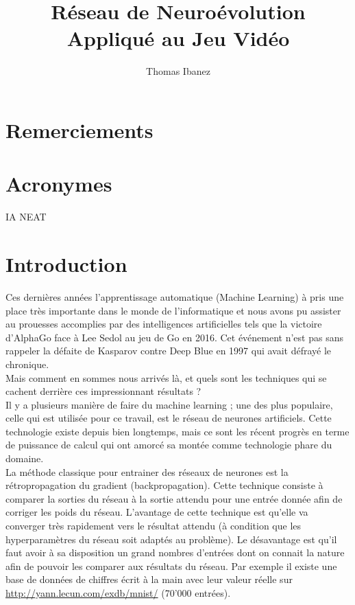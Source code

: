 \documentclass{article}
\title{Réseau de Neuroévolution Appliqué au Jeu Vidéo}
\author{Thomas Ibanez}
\begin{document}
\maketitle
\newpage



\tableofcontents

\newpage

\listoffigures

\newpage

\section*{Remerciements}
\section*{Acronymes}
IA
NEAT


\newpage
\section{Introduction}

Ces dernières années l'apprentissage automatique (Machine Learning) à pris une place très importante dans le monde de l'informatique et nous avons pu assister au prouesses accomplies par des intelligences artificielles tels que la victoire d'AlphaGo face à Lee Sedol au jeu de Go en 2016.\cite{wikialphagolee} Cet événement n'est pas sans rappeler la défaite de Kasparov contre Deep Blue en 1997 qui avait défrayé le chronique.\cite{kasparov}\\
Mais comment en sommes nous arrivés là, et quels sont les techniques qui se cachent derrière ces impressionnant résultats ?\\
Il y a plusieurs manière de faire du machine learning ; une des plus populaire, celle qui est utilisée pour ce travail, est le réseau de neurones artificiels. Cette technologie existe depuis bien longtemps, mais ce sont les récent progrès en terme de puissance de calcul qui ont amorcé sa montée comme technologie phare du domaine.\cite{nnpower}\\

La méthode classique pour entrainer des réseaux de neurones est la rétropropagation du gradient (backpropagation). Cette technique consiste à comparer la sorties du réseau à la sortie attendu pour une entrée donnée afin de corriger les poids du réseau.\cite{backprop} L'avantage de cette technique est qu'elle va converger très rapidement vers le résultat attendu (à condition que les hyperparamètres du réseau soit adaptés au problème). Le désavantage est qu'il faut avoir à sa disposition un grand nombres d'entrées dont on connait la nature afin de pouvoir les comparer aux résultats du réseau. Par exemple il existe une base de données de chiffres écrit à la main avec leur valeur réelle sur \url{http://yann.lecun.com/exdb/mnist/} (70'000 entrées).\\
\end{document}
